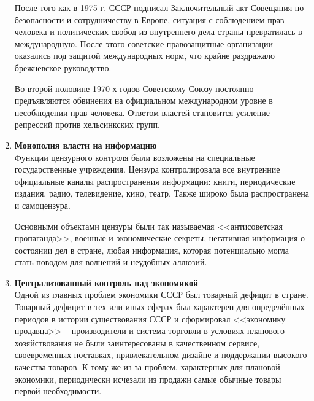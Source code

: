 \documentclass[12pt]{article}
\begin{document}
\begin{enumerate}[label=\textbf{\large\arabic*}]
    После того как в 1975 г. СССР подписал Заключительный акт Совещания по безопасности и сотрудничеству в Европе,
    ситуация с соблюдением прав человека и политических свобод из внутреннего дела страны превратилась в международную.
    После этого советские правозащитные организации оказались под защитой международных норм,
    что крайне раздражало брежневское руководство.

    Во второй половине 1970-х годов Советскому Союзу постоянно предъявляются обвинения
    на официальном международном уровне в несоблюдении прав человека.
    Ответом властей становится усиление репрессий против хельсинкских групп.
    \item \textbf{Монополия власти на информацию} \\
    Функции цензурного контроля были возложены на специальные государственные учреждения.
    Цензура контролировала все внутренние официальные каналы распространения информации:
    книги, периодические издания, радио, телевидение, кино, театр.
    Также широко была распространена и самоцензура.

    Основными объектами цензуры были так называемая <<антисоветская пропаганда>>,
    военные и экономические секреты, негативная информация о состоянии дел в стране,
    любая информация, которая потенциально могла стать поводом для волнений и неудобных аллюзий.
    \item \textbf{Централизованный контроль над экономикой} \\
    Одной из главных проблем экономики СССР был товарный дефицит в стране.
    Товарный дефицит в тех или иных сферах был характерен для определённых периодов в истории существования СССР и сформировал
    <<экономику продавца>> -- производители и система торговли в условиях планового хозяйствования
    не были заинтересованы в качественном сервисе, своевременных поставках,
    привлекательном дизайне и поддержании высокого качества товаров.
    К тому же из-за проблем, характерных для плановой экономики,
    периодически исчезали из продажи самые обычные товары первой необходимости.


\end{enumerate}
\end{document}
